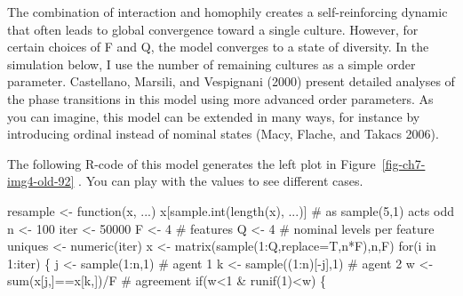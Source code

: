 \documentclass[
  letterpaper,
]{scrbook}
\newenvironment{Shaded}{\begin{snugshade}}{\end{snugshade}}
\newcommand{\AttributeTok}[1]{\textcolor[rgb]{0.40,0.45,0.13}{#1}}
\newcommand{\CommentTok}[1]{\textcolor[rgb]{0.37,0.37,0.37}{#1}}
\newcommand{\ControlFlowTok}[1]{\textcolor[rgb]{0.00,0.23,0.31}{#1}}
\newcommand{\DecValTok}[1]{\textcolor[rgb]{0.68,0.00,0.00}{#1}}
\newcommand{\FunctionTok}[1]{\textcolor[rgb]{0.28,0.35,0.67}{#1}}
\newcommand{\NormalTok}[1]{\textcolor[rgb]{0.00,0.23,0.31}{#1}}
\newcommand{\OtherTok}[1]{\textcolor[rgb]{0.00,0.23,0.31}{#1}}
\newcommand{\SpecialCharTok}[1]{\textcolor[rgb]{0.37,0.37,0.37}{#1}}
\begin{document}
The combination of interaction and homophily creates a self-reinforcing
dynamic that often leads to global convergence toward a single culture.
However, for certain choices of F and Q, the model converges to a state
of diversity. In the simulation below, I use the number of remaining
cultures as a simple order parameter. Castellano, Marsili, and
Vespignani (2000) present detailed analyses of the phase transitions in
this model using more advanced order parameters. As you can imagine,
this model can be extended in many ways, for instance by introducing
ordinal instead of nominal states (Macy, Flache, and Takacs 2006).

The following R-code of this model generates the left plot in
Figure~\ref{fig-ch7-img4-old-92} . You can play with the values to see
different cases.

\begin{Shaded}
\begin{Highlighting}[]
\NormalTok{resample }\OtherTok{\textless{}{-}} \ControlFlowTok{function}\NormalTok{(x, ...) x[}\FunctionTok{sample.int}\NormalTok{(}\FunctionTok{length}\NormalTok{(x), ...)] }\CommentTok{\# as sample(5,1) acts odd}
\NormalTok{n }\OtherTok{\textless{}{-}} \DecValTok{100}
\NormalTok{iter }\OtherTok{\textless{}{-}} \DecValTok{50000}
\NormalTok{F }\OtherTok{\textless{}{-}} \DecValTok{4} \CommentTok{\# features}
\NormalTok{Q }\OtherTok{\textless{}{-}} \DecValTok{4} \CommentTok{\# nominal levels per feature}
\NormalTok{uniques }\OtherTok{\textless{}{-}} \FunctionTok{numeric}\NormalTok{(iter)}
\NormalTok{x }\OtherTok{\textless{}{-}} \FunctionTok{matrix}\NormalTok{(}\FunctionTok{sample}\NormalTok{(}\DecValTok{1}\SpecialCharTok{:}\NormalTok{Q,}\AttributeTok{replace=}\NormalTok{T,n}\SpecialCharTok{*}\NormalTok{F),n,F)}
\ControlFlowTok{for}\NormalTok{(i }\ControlFlowTok{in} \DecValTok{1}\SpecialCharTok{:}\NormalTok{iter)}
\NormalTok{\{}
\NormalTok{  j }\OtherTok{\textless{}{-}} \FunctionTok{sample}\NormalTok{(}\DecValTok{1}\SpecialCharTok{:}\NormalTok{n,}\DecValTok{1}\NormalTok{)       }\CommentTok{\# agent 1}
\NormalTok{  k }\OtherTok{\textless{}{-}} \FunctionTok{sample}\NormalTok{((}\DecValTok{1}\SpecialCharTok{:}\NormalTok{n)[}\SpecialCharTok{{-}}\NormalTok{j],}\DecValTok{1}\NormalTok{) }\CommentTok{\# agent 2}
\NormalTok{  w }\OtherTok{\textless{}{-}} \FunctionTok{sum}\NormalTok{(x[j,]}\SpecialCharTok{==}\NormalTok{x[k,])}\SpecialCharTok{/}\NormalTok{F }\CommentTok{\# agreement}
  \ControlFlowTok{if}\NormalTok{(w}\SpecialCharTok{\textless{}}\DecValTok{1} \SpecialCharTok{\&} \FunctionTok{runif}\NormalTok{(}\DecValTok{1}\NormalTok{)}\SpecialCharTok{\textless{}}\NormalTok{w) \{}

\end{Highlighting}
\end{Shaded}
\end{document}
